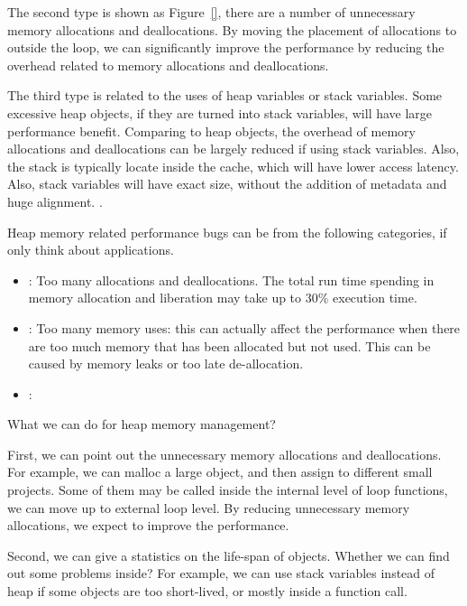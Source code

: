 The second type is shown as Figure~\ref{}, there are a number of unnecessary memory allocations and deallocations. By moving the placement of allocations to outside the loop, we can significantly improve the performance by reducing the overhead related to memory allocations and deallocations. 

The third type is related to the uses of heap variables or stack variables. Some excessive heap objects, if they are turned into stack variables, will have large performance benefit. Comparing to heap objects, the overhead of memory allocations and deallocations can be largely reduced if using stack variables. Also, the stack is typically locate inside the cache, which will have lower access latency. Also, stack variables will have exact size, without the addition of metadata and huge alignment. 
.  
 


Heap memory related performance bugs can be from the following categories, if only think about applications. 

\begin{itemize}
\item: Too many allocations and deallocations. The total run time spending in memory allocation and liberation may take up to 30\% execution time\cite{1190248}. 

\item: Too many memory uses: this can actually affect the performance when there are too much memory that has been allocated but not used. This can be caused by memory leaks or too late de-allocation.   

\item: 
\end{itemize}


What we can do for heap memory management?

First, we can point out the unnecessary memory allocations and deallocations. For example, we can malloc a large object, and then assign to different small projects. Some of them may be called inside the internal level of loop functions, we can move up to external loop level. 
By reducing unnecessary memory allocations, we expect to improve the performance. 

Second, we can give a statistics on the life-span of objects. Whether we can find out some problems inside? For example, we can use stack variables instead of heap if some objects are too short-lived, or mostly inside a function call. 

